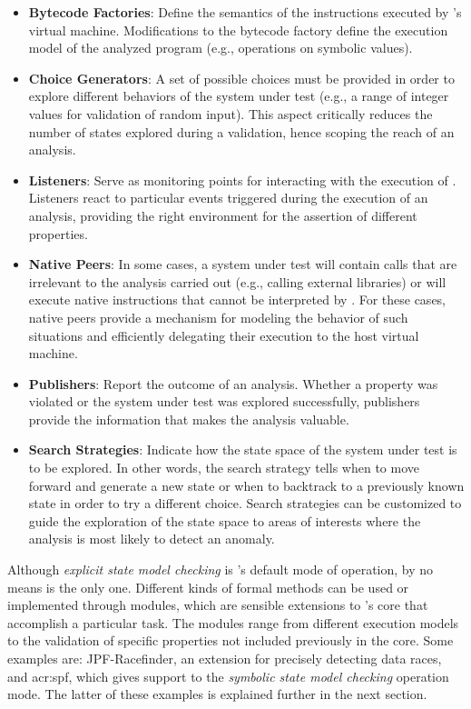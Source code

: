 \begin{itemize}
	\item \textbf{Bytecode Factories}: Define the semantics of the instructions executed by \jpf{}'s virtual machine. Modifications to the bytecode factory define the execution model of the analyzed program (e.g., operations on symbolic values).
	
	\item \textbf{Choice Generators}: A set of possible choices must be provided in order to explore different behaviors of the system under test (e.g., a range of integer values for validation of random input). This aspect critically reduces the number of states explored during a validation, hence scoping the reach of an analysis.
	
	\item \textbf{Listeners}: Serve as monitoring points for interacting with the execution of \jpf{}. Listeners react to particular events triggered during the execution of an analysis, providing the right environment for the assertion of different properties.
	
	\item \textbf{Native Peers}: In some cases, a system under test will contain calls that are irrelevant to the analysis carried out (e.g., calling external libraries) or will execute native instructions that cannot be interpreted by \jpf{}. For these cases, native peers provide a mechanism for modeling the behavior of such situations and efficiently delegating their execution to the host virtual machine.
	
	\item \textbf{Publishers}: Report the outcome of an analysis. Whether a property was violated or the system under test was explored successfully, publishers provide the information that makes the analysis valuable.   
	
	\item \textbf{Search Strategies}: Indicate how the state space of the system under test is to be explored. In other words, the search strategy tells \jpf{} when to move forward and generate a new state or when to backtrack to a previously known state in order to try a different choice. Search strategies can be customized to guide the exploration of the state space to areas of interests where the analysis is most likely to detect an anomaly. 
\end{itemize}

Although \textit{explicit state model checking} is \jpf{}'s default mode of operation, by no means is the only one. Different kinds of formal methods can be used or implemented through modules, which are sensible extensions to \jpf{}'s core that accomplish a particular task. The modules range from different execution models to the validation of specific properties not included previously in the core. Some examples are: JPF-Racefinder, an extension for precisely detecting data races, and \acrfull{acr:spf}, which gives support to the \textit{symbolic state model checking} operation mode. The latter of these examples is explained further in the next section.

